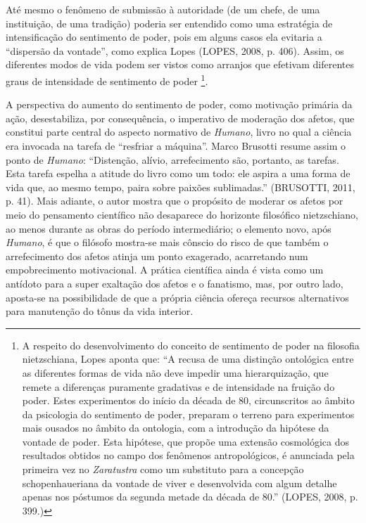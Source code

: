 \documentclass[
	12pt,				%
	openright,			%
	oneside,			%
	a4paper,			%
	english,			%
	french,				%
	spanish,			%
	brazil				%
	]{abntex2}
\begin{document}
Até mesmo o fenômeno de submissão à autoridade (de um chefe, de uma instituição, de uma tradição) poderia ser entendido como uma estratégia de intensificação do sentimento de poder, pois em alguns casos ela evitaria a “dispersão da vontade”, como explica Lopes (LOPES, 2008, p. 406). Assim, os diferentes modos de vida podem ser vistos como arranjos que efetivam diferentes graus de intensidade de sentimento de poder
\footnote{A respeito do desenvolvimento do conceito de sentimento de poder na filosofia nietzschiana, Lopes aponta que: “A recusa de uma distinção ontológica entre as diferentes formas de vida não deve impedir uma hierarquização, que remete a diferenças puramente gradativas e de intensidade na fruição do poder. Estes experimentos do início da década de 80, circunscritos ao âmbito da psicologia do sentimento de poder, preparam o terreno para experimentos mais ousados no âmbito da ontologia, com a introdução da hipótese da vontade de poder. Esta hipótese, que propõe uma extensão cosmológica dos resultados obtidos no campo dos fenômenos antropológicos, é anunciada pela primeira vez no \textit{Zaratustra} como um substituto para a concepção schopenhaueriana da vontade de viver e desenvolvida com algum detalhe apenas nos póstumos da segunda metade da década de 80.” (LOPES, 2008, p. 399.)}. 

A perspectiva do aumento do sentimento de poder, como motivação primária da ação, desestabiliza, por consequência, o imperativo de moderação dos afetos, que constitui parte central do aspecto normativo de \textit{Humano}, livro no qual a ciência era invocada na tarefa de “resfriar a máquina”. Marco Brusotti resume assim o ponto de \textit{Humano}: “Distenção, alívio, arrefecimento são, portanto, as tarefas. Esta tarefa espelha a atitude do livro como um todo: ele aspira a uma forma de vida que, ao mesmo tempo, paira sobre paixões sublimadas.” (BRUSOTTI, 2011, p. 41). Mais adiante, o autor mostra que o propósito de moderar os afetos por meio do pensamento científico não desaparece do horizonte filosófico nietzschiano, ao menos durante as obras do período intermediário; o elemento novo, após \textit{Humano}, é que o filósofo mostra-se mais cônscio do risco de que também o arrefecimento dos afetos atinja um ponto exagerado, acarretando num empobrecimento motivacional. A prática científica ainda é vista como um antídoto para a super exaltação dos afetos e o fanatismo, mas, por outro lado, aposta-se na possibilidade de que a própria ciência ofereça recursos alternativos para manutenção do tônus da vida interior.
\end{document}
